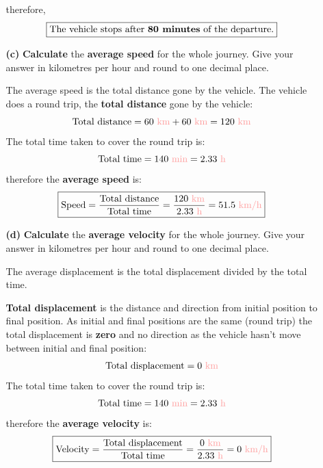 \documentclass[A4,12pt]{article}
\begin{document}
\begin{enumerate}[label=\bfseries (\arabic*)]
\begin{itemize}
\begin{example}
\begin{equation*}
    \end{equation*}
    therefore,
    \begin{equation*}
        \boxed{\text{The vehicle stops after \textbf{80 minutes} of the departure.}}
    \end{equation*}
    \end{example}
     \item[\bf (c)] \textbf{Calculate} the \textbf{average speed} for the whole journey. Give your answer in kilometres per hour and round to one decimal place.
     \begin{example}
     The average speed is the total distance gone by the vehicle. The vehicle does a round trip, the \textbf{total distance} gone by the vehicle:
     \begin{equation*}
         \text{Total distance}=\km{60}+\km{60}=\km{120}
     \end{equation*}
     The total time taken to cover the round trip is:
     \begin{equation*}
         \text{Total time}=\mincgs{140}=\hours{2.33}
     \end{equation*}
     therefore the \textbf{average speed} is:
     \begin{equation*}
         \boxed{\text{Speed}=\frac{\text{Total distance}}{\text{Total time}}=\frac{\km{120}}{\hours{2.33}}=\kmh{51.5}}
     \end{equation*}
     \end{example}
    \item[\bf (d)] \textbf{Calculate} the \textbf{average velocity} for the whole journey. Give your answer in kilometres per hour and round to one decimal place. \cite{Triguero}
    \begin{example}
    The average displacement is the total displacement divided by the total time.
    
    \textbf{Total displacement} is the distance and direction from initial position to final position. As initial and final positions are the same (round trip) the total displacement is \textbf{zero} and no direction as the vehicle hasn't move between initial and final position:
     \begin{equation*}
         \text{Total displacement}=\km{0}
     \end{equation*}
     The total time taken to cover the round trip is:
     \begin{equation*}
         \text{Total time}=\mincgs{140}=\hours{2.33}
     \end{equation*}
     therefore the \textbf{average velocity} is:
     \begin{equation*}
    \boxed{\text{Velocity}=\frac{\text{Total displacement}}{\text{Total time}}=\frac{\km{0}}{\hours{2.33}}=\kmh{0}}
     \end{equation*}
    \end{example}
    

\end{itemize}
\end{enumerate}
\end{document}
